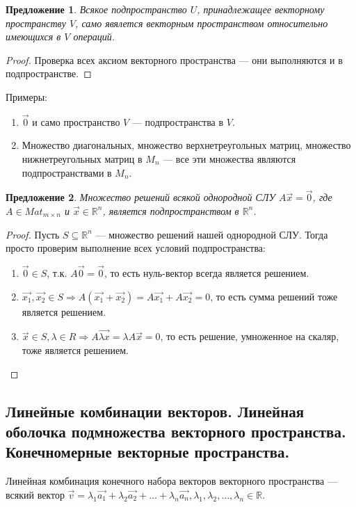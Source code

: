 \documentclass[a4paper, 12pt]{article}
\newtheorem*{proposal}{Предложение}
\newcommand{\bbR}[0]{\mathbb{R}}
\begin{document}
\begin{proposal}
Всякое подпространство $U$, принадлежащее векторному пространству $V$, само явялется векторным пространством относительно имеющихся в $V$ операций.
\end{proposal}
\begin{proof}
Проверка всех аксиом векторного пространства --- они выполняются и в подпространстве.
\end{proof}
Примеры:

\begin{enumerate}
  \item $\vec{0}$ и само пространство $V$  --- подпространства в $V$.
  \item Множество диагональных, множество верхнетреугольных матриц, множество нижнетреугольных матриц в $M_n$ --- все эти множества являются подпространствами в $M_n$.
\end{enumerate}

\begin{proposal}
Множество решений всякой однородной СЛУ $A\vec{x} = \vec{0}$, где $A \in Mat_{m\times n}$ и $\vec{x} \in \bbR^n$, является подпространством в $\bbR^n$.
\end{proposal}
\begin{proof}
Пусть $S \subseteq \bbR^n$ --- множество решений нашей однородной СЛУ. Тогда просто проверим выполнение всех условий подпространства:

\begin{enumerate}
  \item $\vec{0} \in S$, т.к. $A\vec{0} = \vec0$, то есть нуль-вектор всегда является решением.
  \item $\vec{x_1}, \vec{x_2} \in S \Rightarrow A(\vec{x_1} + \vec{x_2}) = A\vec{x_1} + A\vec{x_2}  = 0$, то есть сумма решений тоже является решением.
  \item $\vec{x} \in S, \lambda \in R \Rightarrow A\vec{\lambda x} = \lambda A\vec{x} = 0$, то есть решение, умноженное на скаляр, тоже является решением.
\end{enumerate}
\end{proof}

\subsection{Линейные комбинации векторов. Линейная оболочка подмножества векторного пространства. Конечномерные векторные пространства.}
Линейная комбинация конечного набора векторов векторного пространства --- всякий вектор $\vec v =  \lambda_1\vec{a_1} + \lambda_2\vec{a_2} + \ldots + \lambda_n\vec{a_n}, \lambda_1, \lambda_2, \ldots, \lambda_n \in \mathbb{R}$. 
\end{document}

